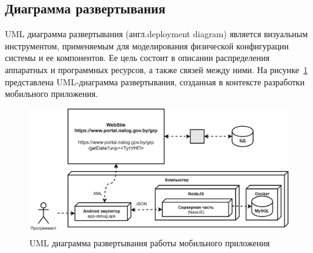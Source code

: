 \subsection{Диаграмма развертывания}

UML диаграмма развертывания (англ.deployment diagram) является визуальным инструментом,
применяемым для моделирования физической конфигурации системы и ее компонентов.
Ее цель состоит в описании распределения аппаратных и программных ресурсов,
а также связей между ними.
На рисунке~\ref{fig:db_UML_deployment_mobile} представлена UML-диаграмма развертывания,
созданная в контексте разработки мобильного приложения.




\begin{figure}[!h]
    \centering

    \includegraphics[width=13cm]
    {images/UML/deployment/mobile.png}

    \caption{UML диаграмма развертывания работы мобильного приложения}

    \label{fig:db_UML_deployment_mobile}
\end{figure}

